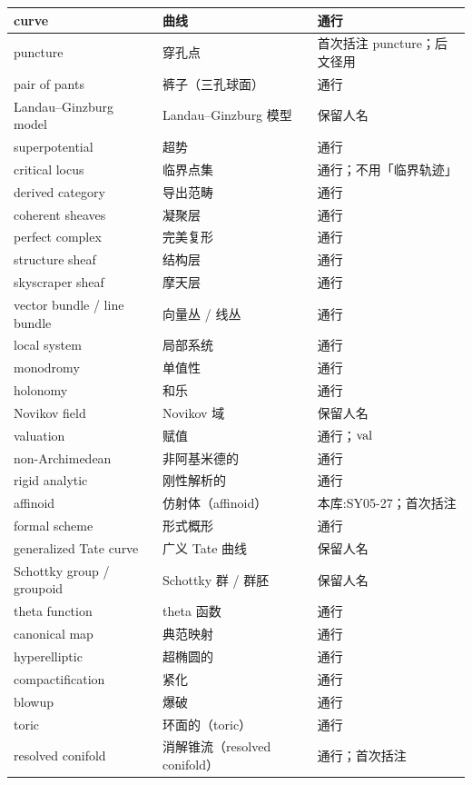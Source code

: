 \begin{longtable}{@{}p{}p{}p{}@{}}
\midrule
curve & 曲线 & 通行 \\
\midrule
puncture & 穿孔点 & 首次括注 puncture；后文径用 \\
\midrule
pair of pants & 裤子（三孔球面） & 通行 \\
\midrule
Landau–Ginzburg model & Landau–Ginzburg 模型 & 保留人名 \\
\midrule
superpotential & 超势 & 通行 \\
\midrule
critical locus & 临界点集 & 通行；不用「临界轨迹」 \\
\midrule
derived category & 导出范畴 & 通行 \\
\midrule
coherent sheaves & 凝聚层 & 通行 \\
\midrule
perfect complex & 完美复形 & 通行 \\
\midrule
structure sheaf & 结构层 & 通行 \\
\midrule
skyscraper sheaf & 摩天层 & 通行 \\
\midrule
vector bundle / line bundle & 向量丛 / 线丛 & 通行 \\
\midrule
local system & 局部系统 & 通行 \\
\midrule
monodromy & 单值性 & 通行 \\
\midrule
holonomy & 和乐 & 通行 \\
\midrule
Novikov field & Novikov 域 & 保留人名 \\
\midrule
valuation & 赋值 & 通行；$\operatorname{val}$ \\
\midrule
non-Archimedean & 非阿基米德的 & 通行 \\
\midrule
rigid analytic & 刚性解析的 & 通行 \\
\midrule
affinoid & 仿射体（affinoid） & 本库:SY05-27；首次括注 \\
\midrule
formal scheme & 形式概形 & 通行 \\
\midrule
generalized Tate curve & 广义 Tate 曲线 & 保留人名 \\
\midrule
Schottky group / groupoid & Schottky 群 / 群胚 & 保留人名 \\
\midrule
theta function & theta 函数 & 通行 \\
\midrule
canonical map & 典范映射 & 通行 \\
\midrule
hyperelliptic & 超椭圆的 & 通行 \\
\midrule
compactification & 紧化 & 通行 \\
\midrule
blowup & 爆破 & 通行 \\
\midrule
toric & 环面的（toric） & 通行 \\
\midrule
resolved conifold & 消解锥流（resolved conifold） & 通行；首次括注 \\

\end{longtable}
